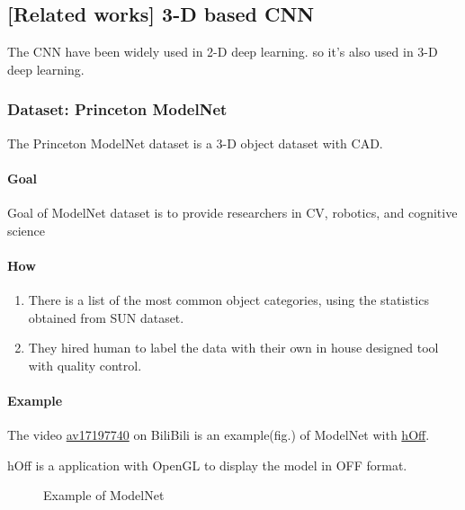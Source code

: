 \documentclass[border=0.5in]{blog}
\begin{document}
    \subsection{[Related works] 3-D based CNN}
    \label{sec:rbm:3d-cnn}
    
    The CNN have been widely used in 2-D deep learning.
    so it's also used in 3-D deep learning.
    
    \subsubsection{Dataset: Princeton ModelNet}
    \label{sec:rbm:ds}
    
    The Princeton ModelNet dataset is a 3-D object dataset with CAD.
    
    \paragraph{Goal}
    Goal of ModelNet dataset is to provide researchers in CV, robotics, and cognitive science 
    
    \paragraph{How}
    \begin{enumerate}
        \item There is a list of the most common object categories, using the statistics obtained from SUN dataset.
        \item They hired human to label the data with their own in house designed tool with quality control.
    \end{enumerate}
    
    \paragraph{Example}
    
    The video \href{https://www.bilibili.com/video/av17197740/}{av17197740} on BiliBili
    is an example(fig.) of ModelNet with \href{https://github.com/Qinka/hOff}{hOff}.
    
    hOff is a application with OpenGL to display the model in OFF format.
    
    \begin{figure}
        \centering
        \caption{Example of ModelNet}
        \label{fig:modelnet}
    \end{figure}
    
\end{document}
